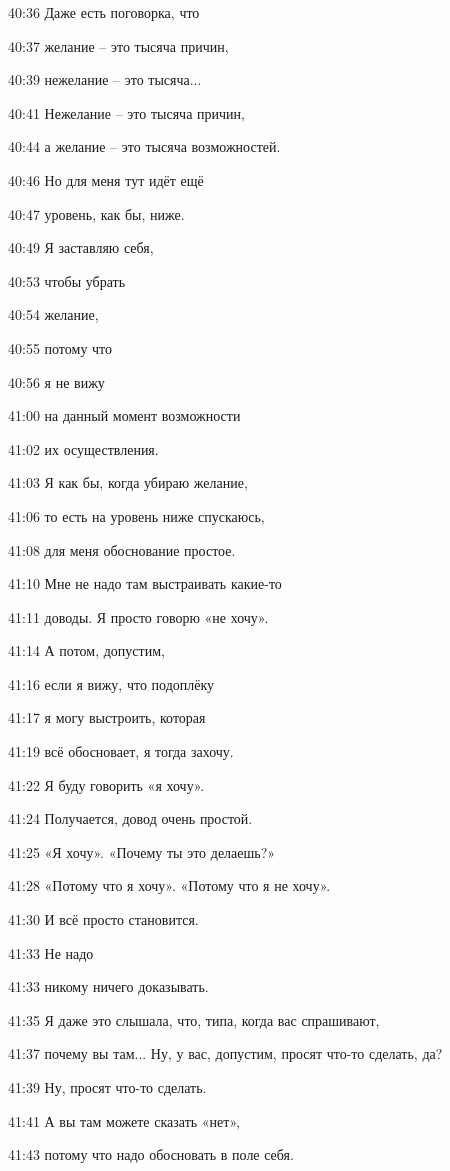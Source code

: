 40:36
Даже есть поговорка, что

40:37
желание – это тысяча причин,

40:39
нежелание – это тысяча...

40:41
Нежелание – это тысяча причин,

40:44
а желание – это тысяча возможностей.

40:46
Но для меня тут идёт ещё

40:47
уровень, как бы, ниже.

40:49
Я заставляю себя,

40:53
чтобы убрать

40:54
желание,

40:55
потому что

40:56
я не вижу

41:00
на данный момент возможности

41:02
их осуществления.

41:03
Я как бы, когда убираю желание,

41:06
то есть на уровень ниже спускаюсь,

41:08
для меня обоснование простое.

41:10
Мне не надо там выстраивать какие-то

41:11
доводы. Я просто говорю «не хочу».

41:14
А потом, допустим,

41:16
если я вижу, что подоплёку

41:17
я могу выстроить, которая

41:19
всё обосновает, я тогда захочу.

41:22
Я буду говорить «я хочу».

41:24
Получается, довод очень простой.

41:25
«Я хочу». «Почему ты это делаешь?»

41:28
«Потому что я хочу». «Потому что я не хочу».

41:30
И всё просто становится.

41:33
Не надо

41:33
никому ничего доказывать.

41:35
Я даже это слышала, что, типа, когда вас спрашивают,

41:37
почему вы там... Ну, у вас, допустим, просят что-то сделать, да?

41:39
Ну, просят что-то сделать.

41:41
А вы там можете сказать «нет»,

41:43
потому что надо обосновать в поле себя.

